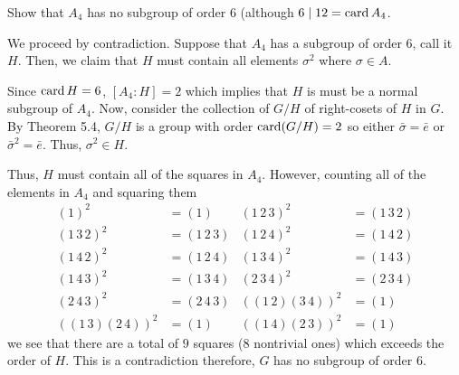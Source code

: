 \begin{problem}
  Show that \(A_4\) has no subgroup of order \(6\) (although
  \(6\mid 12=\operatorname{card} A_4\).
\end{problem}
\begin{solution}
  We proceed by contradiction. Suppose that \(A_4\) has a subgroup of order
  \(6\), call it \(H\). Then, we claim that \(H\) must contain all elements
  \(\sigma^2\) where \(\sigma\in A\).
  \begin{subproof}
    Since \(\operatorname{card} H=6\), \([A_4:H]=2\) which implies that \(H\) is must be
    a normal subgroup of \(A_4\). Now, consider the collection of \(G/H\)
    of right-cosets of \(H\) in \(G\). By Theorem 5.4, \(G/H\) is a group
    with order \(\operatorname{card}(G/H)=2\) so either \(\bar\sigma=\bar e\) or
    \({\bar\sigma}^2=\bar e\). Thus, \(\sigma^2\in H\).
  \end{subproof}
  Thus, \(H\) must contain all of the squares in \(A_4\). However, counting
  all of the elements in \(A_4\) and squaring them
  \begin{align*}
    (1)^2&=(1)
    &(1\,2\,3)^2&=(1\,3\,2)
    \\
    (1\,3\,2)^2&=(1\,2\,3)
    &(1\,2\,4)^2&=(1\,4\,2)\\
    (1\,4\,2)^2&=(1\,2\,4)
    &(1\,3\,4)^2&=(1\,4\,3)\\
    (1\,4\,3)^2&=(1\,3\,4)
    &(2\,3\,4)^2&=(2\,3\,4)\\
    (2\,4\,3)^2&=(2\,4\,3)
    &((1\,2)(3\,4))^2
             &=(1)\\
    ((1\,3)(2\,4))^2&=(1)&
    ((1\,4)(2\,3))^2&=(1)
  \end{align*}
  we see that there are a total of \(9\) squares (\(8\) nontrivial ones)
  which exceeds the order of \(H\). This is a contradiction therefore,
  \(G\) has no subgroup of order \(6\).
\end{solution}


